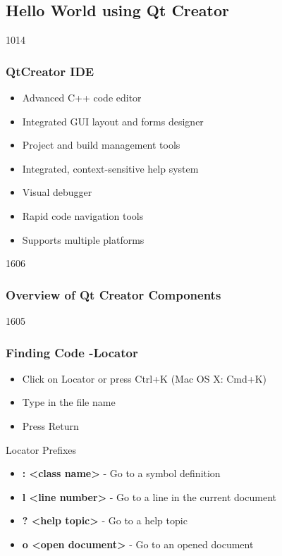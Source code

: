 \subsection{Hello World using Qt Creator}

\begin{slide}{1014}\frametitle{QtCreator IDE} \label{qtcreator}
\begin{itemize}
  \item Advanced C++ code editor
  \item Integrated GUI layout and forms designer
  \item Project and build management tools
  \item Integrated, context-sensitive help system
  \item Visual debugger
  \item Rapid code navigation tools
  \item Supports multiple platforms
  \end{itemize}
\end{slide}


\begin{slide}{1606}
  \frametitle{Overview of Qt Creator Components}
\end{slide}

\begin{slide}{1605}
  \frametitle{Finding Code -Locator}
 \begin{itemize}
  \item Click on Locator or press Ctrl+K (Mac OS X: Cmd+K)
 \item Type in the file name
 \item Press Return
 \end{itemize}
 \newline
 Locator Prefixes
 \begin{itemize}
 \item \textbf{: <class name>} - Go to a symbol definition
 \item \textbf{l <line number> } - Go to a line in the current document
 \item \textbf{? <help topic>} - Go to a help topic
 \item \textbf{o <open document>} - Go to an opened document
 \end{itemize}
\end{slide}

